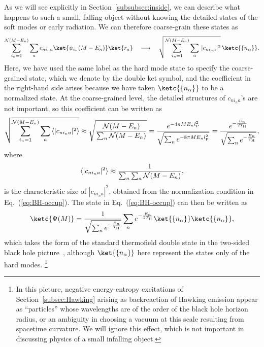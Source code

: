 \documentclass[12pt]{article}
\begin{document}
As we will see explicitly in Section~\ref{subsubsec:inside}, we 
can describe what happens to such a small, falling object without 
knowing the detailed states of the soft modes or early radiation. 
We can therefore coarse-grain these states as
%
\begin{equation}
  \sum_{i_n = 1}^{{\cal N}(M-E_n)} \sum_a c_{n i_n a} 
    \ket{\psi_{i_n}(M-E_n)} \ket{r_a} 
  \quad\longrightarrow\quad
  \sqrt{\sum_{i_n = 1}^{{\cal N}(M-E_n)} \sum_a\, 
    |c_{n i_n a}|^2}\, \ketc{\{ n_\alpha \}}.
\label{eq:coarse}
\end{equation}
%
Here, we have used the same label as the hard mode state to specify 
the coarse-grained state, which we denote by the double ket symbol, 
and the coefficient in the right-hand side arises because we have 
taken $\ketc{\{ n_\alpha \}}$ to be a normalized state.  At the 
coarse-grained level, the detailed structures of $c_{n i_n a}$'s 
are not important, so this coefficient can be written as
%
\begin{equation}
  \sqrt{\sum_{i_n = 1}^{{\cal N}(M-E_n)} \sum_a\, 
    \langle |c_{n i_n a}|^2 \rangle} 
  \approx \sqrt{\frac{{\cal N}(M-E_n)}{\sum_n {\cal N}(M-E_n)}}
  = \frac{e^{-4\pi M E_n l_{\rm P}^2}}
      {\sqrt{\sum_n e^{-8\pi M E_n l_{\rm P}^2}}} 
  = \frac{e^{-\frac{E_n}{2 T_{\rm H}}}}
      {\sqrt{\sum_n e^{-\frac{E_n}{T_{\rm H}}}}},
\label{eq:c-coeff}
\end{equation}
%
where
%
\begin{equation}
    \langle |c_{n i_n a}|^2 \rangle 
  \approx \frac{1}{\sum_n \sum_a {\cal N}(M-E_n)},
\label{eq:c-exp}
\end{equation}
%
is the characteristic size of $|c_{n i_n a}|^2$, obtained from the 
normalization condition in Eq.~(\ref{eq:BH-occup}).  The state in 
Eq.~(\ref{eq:BH-occup}) can then be written as
%
\begin{equation}
  \ketc{\Psi(M)} 
  = \frac{1}{\sqrt{\sum_n e^{-\frac{E_n}{T_{\rm H}}}}} 
    \sum_n e^{-\frac{E_n}{2 T_{\rm H}}} 
    \ket{\{ n_\alpha \}} \ketc{\{ n_\alpha \}},
\label{eq:BH-coarse}
\end{equation}
%
which takes the form of the standard thermofield double state in 
the two-sided black hole picture~\cite{Unruh:1976db,Israel:1976ur}, 
although $\ket{\{ n_\alpha \}}$ here represent the states only of 
the hard modes.%
\footnote{In this picture, negative energy-entropy excitations of 
 Section~\ref{subsec:Hawking} arising as backreaction of Hawking 
 emission appear as ``particles'' whose wavelengths are of the 
 order of the black hole horizon radius, or an ambiguity in 
 choosing a vacuum at this scale resulting from spacetime curvature. 
 We will ignore this effect, which is not important in discussing 
 physics of a small infalling object.}
\end{document}
